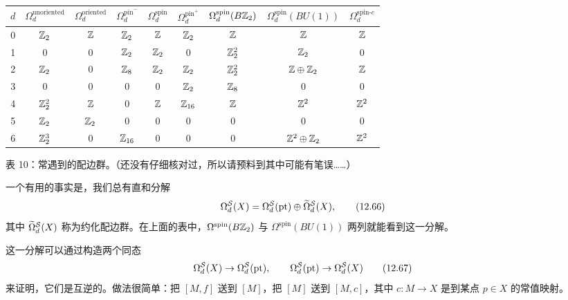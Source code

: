 \begin{center}
  \small
  \setlength{\tabcolsep}{4pt}
  \begin{tabular}{c||cc|ccc|ccc}
    \toprule
    $d$
    & $\Omega_d^{\mathrm{unoriented}}$ & $\Omega_d^{\mathrm{oriented}}$
    & $\Omega_d^{\mathrm{pin}^-}$ & $\Omega_d^{\mathrm{spin}}$ & $\Omega_d^{\mathrm{pin}^+}$
    & $\Omega_d^{\mathrm{spin}}(B\mathbb{Z}_2)$ & $\Omega_d^{\mathrm{spin}}(BU(1))$
    & $\Omega_d^{\mathrm{spin}\text{-}c}$ \\
    \midrule
    0 & $\mathbb{Z}_2$ & $\mathbb{Z}$ & $\mathbb{Z}_2$ & $\mathbb{Z}$ & $\mathbb{Z}_2$ & $\mathbb{Z}$ & $\mathbb{Z}$ & $\mathbb{Z}$ \\
    1 & $0$ & $0$ & $\mathbb{Z}_2$ & $\mathbb{Z}_2$ & $0$ & $\mathbb{Z}_2^2$ & $\mathbb{Z}_2$ & $0$ \\
    2 & $\mathbb{Z}_2$ & $0$ & $\mathbb{Z}_8$ & $\mathbb{Z}_2$ & $\mathbb{Z}_2$ & $\mathbb{Z}_2^2$ & $\mathbb{Z}\oplus\mathbb{Z}_2$ & $\mathbb{Z}$ \\
    3 & $0$ & $0$ & $0$ & $0$ & $\mathbb{Z}_2$ & $\mathbb{Z}_8$ & $0$ & $0$ \\
    4 & $\mathbb{Z}_2^2$ & $\mathbb{Z}$ & $0$ & $\mathbb{Z}$ & $\mathbb{Z}_{16}$ & $\mathbb{Z}$ & $\mathbb{Z}^2$ & $\mathbb{Z}^2$ \\
    5 & $\mathbb{Z}_2$ & $\mathbb{Z}_2$ & $0$ & $0$ & $0$ & $0$ & $0$ & $0$ \\
    6 & $\mathbb{Z}_2^3$ & $0$ & $\mathbb{Z}_{16}$ & $0$ & $0$ & $0$ & $\mathbb{Z}^2\oplus\mathbb{Z}_2$ & $\mathbb{Z}^2$ \\
    \bottomrule
  \end{tabular}

  \smallskip
  {\small 表 10：常遇到的配边群。（还没有仔细核对过，所以请预料到其中可能有笔误……）\par}
\end{center}

一个有用的事实是，我们总有直和分解
\begin{equation}
  \Omega^{\mathcal S}_d(X)=\Omega^{\mathcal S}_d(\mathrm{pt})\oplus
  \widetilde{\Omega}^{\mathcal S}_d(X),
  \tag{12.66}
\end{equation}
其中 $\widetilde{\Omega}^{\mathcal S}_d(X)$ 称为约化配边群。在上面的表中，$\Omega^{\mathrm{spin}}(B\mathbb{Z}_2)$ 与 $\Omega^{\mathrm{spin}}(BU(1))$ 两列就能看到这一分解。

这一分解可以通过构造两个同态
\begin{equation}
  \Omega^{\mathcal S}_d(X)\to\Omega^{\mathcal S}_d(\mathrm{pt}),\qquad
  \Omega^{\mathcal S}_d(\mathrm{pt})\to\Omega^{\mathcal S}_d(X)
  \tag{12.67}
\end{equation}
来证明，它们是互逆的。做法很简单：把 $[M,f]$ 送到 $[M]$，把 $[M]$ 送到 $[M,c]$，其中 $c:M\to X$ 是到某点 $p\in X$ 的常值映射。

